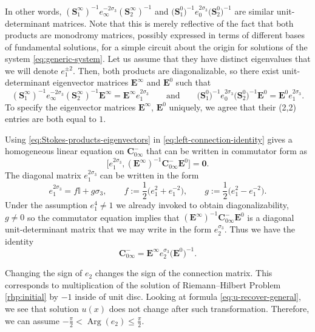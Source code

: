 \documentclass[11pt]{article}
\numberwithin{equation}{section}
\numberwithin{equation}{section}
\renewcommand{\arg}{\operatorname{Arg}}
\begin{document}
 In other words, $ (\mathbf{S}^\infty_{1})^{-1}e_\infty^{-2\sigma_3}(\mathbf{S}_{2}^\infty )^{-1}$ and $\big(\mathbf{S}^0_{1}\big)^{-1}e_0^{2\sigma_3}\big(\mathbf{S}_{2}^0 \big)^{-1}$ are similar unit-determinant matrices. Note that this is merely reflective of the fact that both products are monodromy matrices, possibly expressed in terms of different bases of fundamental solutions, for a simple circuit about the origin for solutions of the system \eqref{eq:generic-system}. Let us assume that they have distinct eigenvalues that we will denote $e_1^{\pm 2}$. Then, both products are diagonalizable, so there exist unit-determinant eigenvector matrices $\mathbf{E}^\infty$ and $\mathbf{E}^0$ such that
 \begin{equation}
 (\mathbf{S}^\infty_{1})^{-1}e_\infty^{-2\sigma_3}(\mathbf{S}_{2}^\infty )^{-1}\mathbf{E}^\infty=\mathbf{E}^\infty e_1^{2\sigma_3}\qquad\text{and}\qquad
 \big(\mathbf{S}^0_{1}\big)^{-1}e_0^{2\sigma_3}\big(\mathbf{S}_{2}^0 \big)^{-1}\mathbf{E}^0=\mathbf{E}^0 e_1^{2\sigma_3}.
 \label{eq:Stokes-products-eigenvectors}
 \end{equation}
To specify the eigenvector matrices $\mathbf{E}^\infty$, $\mathbf{E}^0$ uniquely, we agree that their (2,2) entries are both equal to $1$.


 Using \eqref{eq:Stokes-products-eigenvectors} in \eqref{eq:left-connection-identity} gives a homogeneous linear equation on $\mathbf{C}_{0\infty}^-$ that can be written in commutator form as
 \begin{equation*}
 \big[e_1^{2\sigma_3},(\mathbf{E}^\infty)^{-1}\mathbf{C}_{0\infty}^-\mathbf{E}^0\big]=\mathbf{0}.
 \end{equation*}
 The diagonal matrix $e_1^{2\sigma_3}$ can be written in the form
 \begin{equation*}
 e_1^{2\sigma_3}=f\mathbb{I}+g\sigma_3,\qquad f:= \frac{1}{2}\big(e_1^2+e_1^{-2}\big),\qquad g:=\frac{1}{2}\big(e_1^2-e_1^{-2}\big).
 \end{equation*}
 Under the assumption $e_1^4\neq 1$ we already invoked to obtain diagonalizability, $g\neq 0$ so the commutator equation implies that $(\mathbf{E}^\infty)^{-1}\mathbf{C}_{0\infty}^-\mathbf{E}^0$ is a diagonal unit-determinant matrix that we may write in the form $e_2^{\sigma_3}$. Thus we have the identity
 \begin{equation}
 \label{eq:C-zero-infty-diagonalization}
 \mathbf{C}_{0\infty}^-=\mathbf{E}^\infty e_2^{\sigma_3}\big(\mathbf{E}^0\big)^{-1}.
 \end{equation}
 \begin{Remark}\label{remark:change-sign-e2}
 Changing the sign of $e_2$ changes the sign of the connection matrix. This corresponds to multiplication of the solution of Riemann--Hilbert Problem \ref{rhp:initial} by $-1$ inside of unit disc. Looking at formula \eqref{eq:u-recover-general}, we see that solution $u(x)$ does not change after such transformation. Therefore, we can assume $-\frac{\pi}{2}<\arg(e_2)\leq\frac{\pi}{2}$.
 \end{Remark}
\end{document}
